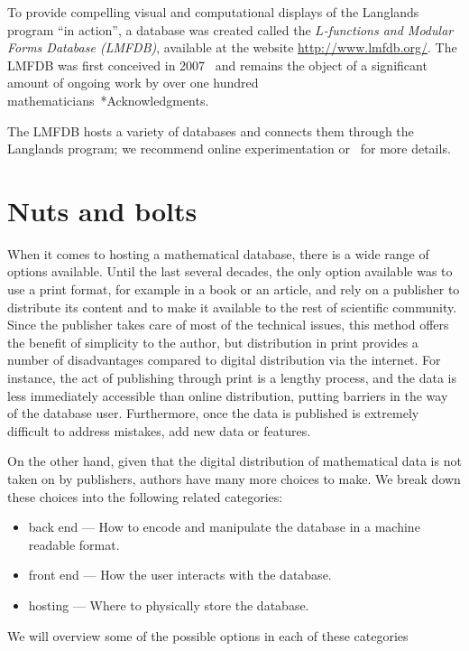 \documentclass{amsart}
\begin{document}
To provide compelling visual and computational displays of the Langlands program ``in action'', a database was created called the \emph{$L$-functions and Modular Forms Database (LMFDB)}, available at the website \url{http://www.lmfdb.org/}.
The LMFDB was first conceived in 2007~\cite{cremona-16} and remains the object of a significant amount of ongoing work by over one hundred mathematicians~\cite{lmfdb}*{Acknowledgments}.

The LMFDB hosts a variety of databases and connects them through the Langlands program; we recommend online experimentation or~\cite{cremona-16} for more details.


\section{Nuts and bolts}
\label{sec:nutsbolts}

When it comes to hosting a mathematical database, there is a wide range of options available.
Until the last several decades, the only option available was to use a print format, for example in a book or an article, and rely on a publisher to distribute its content and to make it available to the rest of scientific community.
Since the publisher takes care of most of the technical issues, this method offers the benefit of simplicity to the author, but distribution in print provides a number of disadvantages compared to digital distribution via the internet.
For instance, the act of publishing through print is a lengthy process, and the data is less immediately accessible than online distribution, putting barriers in the way of the database user.
Furthermore, once the data is published is extremely difficult to address  mistakes, add new data or features.

On the other hand, given that the digital distribution of mathematical data is not taken on by publishers, authors have many more choices to make.
We break down these choices into the following related categories:
\begin{itemize}
  \item back end --- How to encode and manipulate the database in a machine readable format.
  \item front end --- How the user interacts with the database.
  \item hosting --- Where to physically store the database.
\end{itemize}
We will overview some of the possible options in each of these categories
\end{document}
